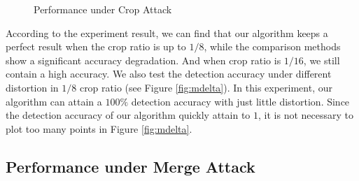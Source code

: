 \begin{figure}[h]
\centering
{}
\caption{Performance under Crop Attack}
\end{figure}

According to the experiment result, we can find that our algorithm keeps a perfect
result when the crop ratio is up to $1/8$, while the comparison methods show a significant
accuracy degradation. And when crop ratio is $1/16$, we still contain a high accuracy.
We also test the detection accuracy under different distortion in $1/8$ crop ratio
(see Figure \ref{fig:mdelta}). In this experiment, our algorithm can attain
a $100\%$ detection accuracy with just little distortion. Since the detection accuracy of 
our algorithm quickly attain to $1$, it is not necessary to plot too many points in Figure 
\ref{fig:mdelta}.


\subsection{Performance under Merge Attack}


